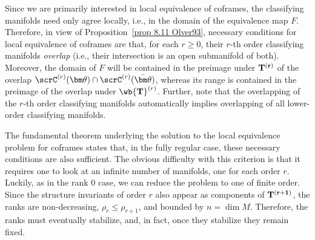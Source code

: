 Since we are primarily interested in local equivalence of coframes, the classifying manifolds need only agree locally, i.e., in the domain of the equivalence map $F$. Therefore, in view of Proposition~\ref{prop 8.11 Olver93}, necessary conditions for local equivalence of coframes are that, for each $r\geq 0$, their $r$-th order classifying manifolds \emph{overlap} (i.e., their intersection is an open submanifold of both). Moreover, the domain of $F$ will be contained in the preimage under $\bf{T}^{(r)}$ of the overlap $\scrC^{(r)}(\bm\theta)\cap \scrC^{(r)}(\bar{\bm\theta})$, whereas its range is contained in the preimage of the overlap under $\wb{\bf{T}}^{(r)}$. Further, note that the overlapping of the $r$-th order classifying manifolds automatically implies overlapping of all lower-order classifying manifolds.

The fundamental theorem underlying the solution to the local equivalence problem for coframes states that, in the fully regular case, these necessary conditions are also sufficient. The obvious difficulty with this criterion is that it requires one to look at an infinite number of manifolds, one for each order $r$. Luckily, as in the rank $0$ case, we can reduce the problem to one of finite order. Since the structure invariants of order $r$ also appear as components of $\bf{T}^{(r+1)}$, the ranks are non-decreasing, $\rho_r\leq \rho_{r+1}$, and bounded by $n=\dim M$. Therefore, the ranks must eventually stabilize, and, in fact, once they stabilize they remain fixed. 

